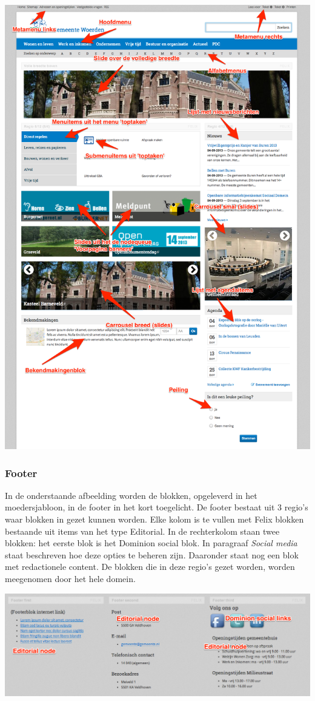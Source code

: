\begin{center}
	\includegraphics[width=\textwidth]{img/voorpagina.png}
\end{center}

\subsubsection{Footer}

In de onderstaande afbeelding worden de blokken, opgeleverd in het moedersjabloon, in de footer in het kort toegelicht. De footer bestaat uit 3 regio's waar blokken in gezet kunnen worden. Elke kolom is te vullen met Felix blokken bestaande uit items van het type Editorial. In de rechterkolom staan twee blokken: het eerste blok is het Dominion social blok. In paragraaf \emph{Social media} staat beschreven hoe deze opties te beheren zijn. Daaronder staat nog een blok met redactionele content. De blokken die in deze regio's gezet worden, worden meegenomen door het hele domein.

\bigskip

\begin{center}
	\includegraphics[width=\textwidth]{img/voorpagina3.png}
\end{center}